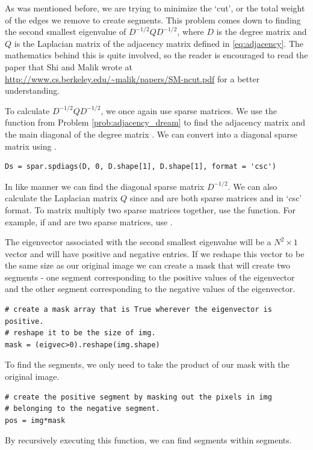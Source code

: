 As was mentioned before, we are trying to minimize the `cut', or the total weight of the edges we remove to create segments. This problem comes down to finding the second smallest eigenvalue of $D^{-1/2}QD^{-1/2}$, where $D$ is the degree matrix and $Q$ is the Laplacian matrix of the adjacency matrix defined in \eqref{eq:adjacency}. The mathematics behind this is quite involved, so the reader is encouraged to read the paper that Shi and Malik wrote at \url{http://www.cs.berkeley.edu/~malik/papers/SM-ncut.pdf} for a better understanding.
	
To calculate $D^{-1/2}QD^{-1/2}$, we once again use sparse matrices. We use the  function from Problem \ref{prob:adjacency_dream} to find the adjacency matrix  and the main diagonal of the degree matrix . We can convert  into a diagonal sparse matrix using .

\begin{lstlisting}
Ds = spar.spdiags(D, 0, D.shape[1], D.shape[1], format = 'csc')
\end{lstlisting}

In like manner we can find the diagonal sparse matrix $D^{-1/2}$. We can also calculate the Laplacian matrix $Q$ since  and  are both sparse matrices and in `csc' format. To matrix multiply two sparse matrices together, use the  function. For example, if  and  are two sparse matrices, use .

The eigenvector associated with the second smallest eigenvalue will be a $N^2 \times 1$ vector and will have positive and negative entries. If we reshape this vector to be the same size as our original image we can create a mask that will create two segments - one segment corresponding to the positive values of the eigenvector and the other segment corresponding to the negative values of the eigenvector. 

\begin{lstlisting}
# create a mask array that is True wherever the eigenvector is positive.
# reshape it to be the size of img.
mask = (eigvec>0).reshape(img.shape)
\end{lstlisting}
To find the segments, we only need to take the product of our mask with the original image.

\begin{lstlisting}
# create the positive segment by masking out the pixels in img 
# belonging to the negative segment.
pos = img*mask
\end{lstlisting}
By recursively executing this function, we can find segments within segments.



